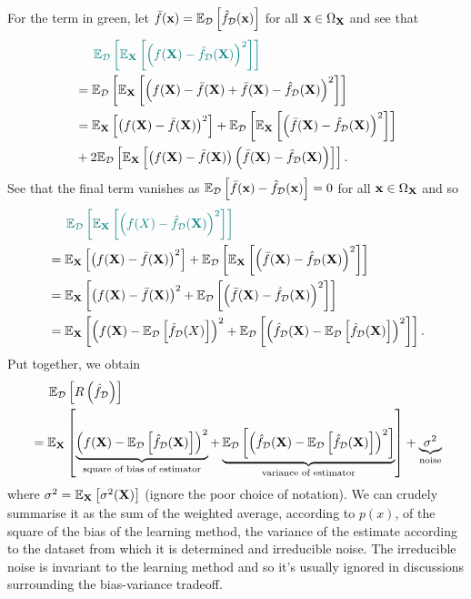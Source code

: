 \documentclass[11pt]{article}
\begin{document}
For the term in green, let $\bar{f}(\mathbf{x})=\mathbb{E}_{\mathcal{D}}\left[\hat{f}_{\mathcal{D}}(\mathbf{x})\right]$ for all $\mathbf{x}\in\Omega_{\mathbf{X}}$ and see that
\begin{align*}
    &\hspace{14.52pt}
    \textcolor{myGreen}{\E_{\D}\l[\E_\X\l[\l(f(\X)-\hat{f}_{\D}(\X)\r)^2\r]\r]}\\
    &=
    \E_{\D}\l[\E_\X\l[\l(f(\X)-\bar{f}(\X)+\bar{f}(\X)-\hat{f}_{\D}(\X)\r)^2\r]\r]\\
    &=
    \E_\X\l[\l(f(\X)-\bar{f}(\X)\r)^2\r]+\E_{\D}\l[\E_\X\l[\l(\bar{f}(\X)-\hat{f}_{\D}(\X)\r)^2\r]\r]\\
    &+
    2\E_{\D}\l[\E_\X\l[\l(f(\X)-\bar{f}(\X)\r)\l(\bar{f}(\X)-\hat{f}_{\D}(\X)\r)\r]\r].
\end{align*}
See that the final term vanishes as $\mathbb{E}_{\mathcal{D}}\left[\bar{f}(\mathbf{x})-\hat{f}_{\mathcal{D}}(\mathbf{x})\right]=0$ for all $\mathbf{x}\in\Omega_{\mathbf{X}}$ and so
\begin{align*}
    &\hspace{14.52pt}
    \textcolor{myGreen}{\E_{\D}\l[\E_\X\l[\l(f(X)-\hat{f}_{\D}(\X)\r)^2\r]\r]}\\
    &=
    \E_\X\l[\l(f(\X)-\bar{f}(\X)\r)^2\r]+\E_{\D}\l[\E_\X\l[\l(\bar{f}(\X)-\hat{f}_{\D}(\X)\r)^2\r]\r]\\
    &=
    \E_\X\l[\l(f(\X)-\bar{f}(\X)\r)^2+\E_{\D}\l[\l(\bar{f}(\X)-\hat{f}_{\D}(\X)\r)^2\r]\r]\\
    &=
    \E_\X\l[\l(f(\X)-\E_{\D}\l[\hat{f}_{\D}(X)\r]\r)^2+\E_{\D}\l[\l(\hat{f}_{\D}(\X)-\E_{\D}\l[\hat{f}_{\D}(\X)\r]\r)^2\r]\r].
\end{align*}
Put together, we obtain
\begin{align*}
    &\hspace{14.52pt}
    \mathbb{E}_{\mathcal{D}}\left[R\left(\hat{f}_{\mathcal{D}}\right)\right]\\
    &=
    \mathbb{E}_{\mathbf{X}}\left[\underbrace{\left(f(\mathbf{X})-\mathbb{E}_{\mathcal{D}}\left[\hat{f}_{\mathcal{D}}(\mathbf{X})\right]\right)^2}_{\text{square of bias of estimator}}+\underbrace{\mathbb{E}_{\mathcal{D}}\left[\left(\hat{f}_{\mathcal{D}}(\mathbf{X})-\mathbb{E}_{\mathcal{D}}\left[\hat{f}_{\mathcal{D}}(\mathbf{X})\right]\right)^2\right]}_{\text{variance of estimator}}\right]+\underbrace{\sigma^2}_{\text{noise}}
\end{align*}
where $\sigma^2=\mathbb{E}_{\mathbf{X}}\left[\sigma^2(\mathbf{X})\right]$ (ignore the poor choice of notation). We can crudely summarise it as the sum of the weighted average, according to $p(x)$, of the square of the bias of the learning method, the variance of the estimate according to the dataset from which it is determined and irreducible noise. The irreducible noise is invariant to the learning method and so it's usually ignored in discussions surrounding the bias-variance tradeoff.
\end{document}
